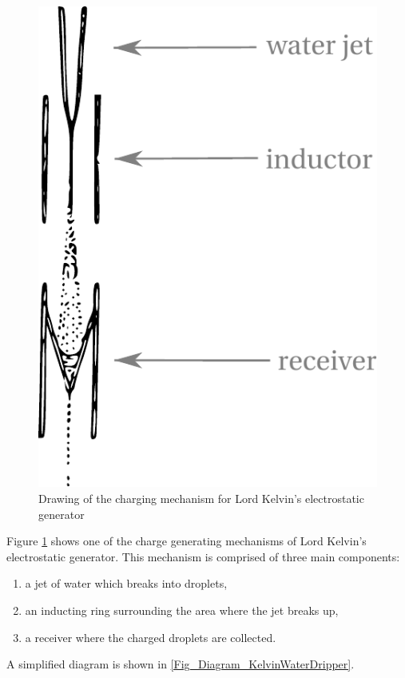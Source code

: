 \begin{figure}
    \centering
    \includegraphics[height=0.25\textheight]{content/appendices/chargedWaterDrops/graphics/Figure_Drawing_KelvinWaterDripper_ChargingMechanism}
    \caption{Drawing of the charging mechanism for Lord Kelvin's electrostatic
generator}
    \label{Figure_Drawing_KelvinWaterDripper_ChargingMechanism}
\end{figure}
Figure \ref{Figure_Drawing_KelvinWaterDripper_ChargingMechanism} shows one of the charge generating mechanisms of Lord Kelvin's electrostatic generator.
This mechanism is comprised of three main components:
\begin{enumerate}
\item a jet of water which breaks into droplets,
\item an inducting ring surrounding the area where the jet breaks up,
\item a receiver where the charged droplets are collected.
\end{enumerate}
A simplified diagram is shown in \cref{Fig_Diagram_KelvinWaterDripper}.
